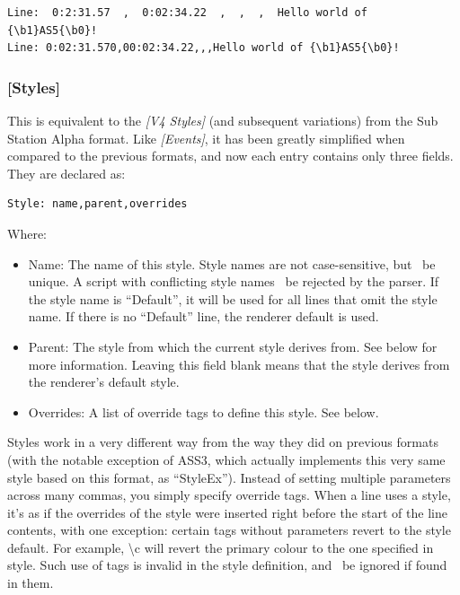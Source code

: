 \documentclass{spec}
\begin{document}
\begin{verbatim}
Line:  0:2:31.57  ,  0:02:34.22  ,  ,  ,  Hello world of {\b1}AS5{\b0}!
Line: 0:02:31.570,00:02:34.22,,,Hello world of {\b1}AS5{\b0}!
\end{verbatim}


\subsubsection{[Styles]}

This is equivalent to the \emph{[V4 Styles]} (and subsequent variations) from the Sub Station Alpha format.
Like \emph{[Events]}, it has been greatly simplified when compared to the previous formats, and now
each entry contains only three fields. They are declared as:

\begin{verbatim}
Style: name,parent,overrides
\end{verbatim}

Where:

\begin{itemize}
\item Name: The name of this style. Style names are not case-sensitive, but \must\ be unique. A
script with conflicting style names \must\ be rejected by the parser. If the style name is ``Default'', it
will be used for all lines that omit the style name. If there is no ``Default'' line, the renderer
default is used.
\item Parent: The style from which the current style derives from. See below for more information.
Leaving this field blank means that the style derives from the renderer's default style.
\item Overrides: A list of override tags to define this style. See below.
\end{itemize}

Styles work in a very different way from the way they did on previous formats (with the notable exception
of ASS3, which actually implements this very same style based on this format, as ``StyleEx'').
Instead of setting multiple parameters across many commas, you simply specify override tags. When a line
uses a style, it's as if the overrides of the style were inserted right before the start of the line
contents, with one exception: certain tags without parameters revert to the style default. For example,
\textbackslash c will revert the primary colour to the one specified in style. Such use of tags is invalid
in the style definition, and \must\ be ignored if found in them.
\end{document}
